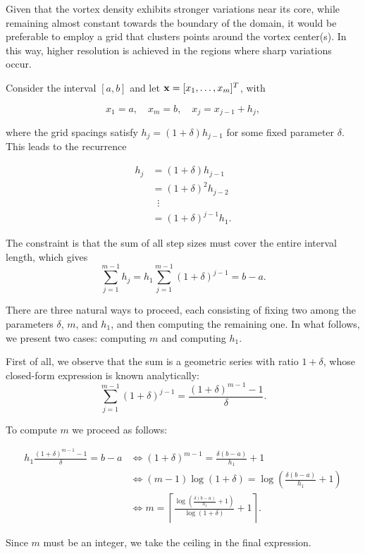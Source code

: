 Given that the vortex density exhibits stronger variations near its core, while remaining almost constant towards the boundary of the domain, it would be preferable to employ a grid that clusters points around the vortex center(s). 
In this way, higher resolution is achieved in the regions where sharp variations occur.

Consider the interval $[a,b]$ and let $\mathbf{x} = [x_1, \dots, x_m]^T$, with 

\[
    x_1 = a, \quad x_m = b, \quad x_j = x_{j-1} + h_j,
\]

where the grid spacings satisfy $h_j = (1 + \delta) h_{j-1}$ for some fixed parameter $\delta$.  
This leads to the recurrence

\begin{align*}
    h_j &= (1 + \delta) h_{j-1} \\
        &= (1 + \delta)^2 h_{j-2} \\
        &\;\;\vdots \\
        &= (1 + \delta)^{j-1} h_1.
\end{align*}

The constraint is that the sum of all step sizes must cover the entire interval length, which gives
\[
    \sum_{j=1}^{m-1} h_j
    = h_1 \sum_{j=1}^{m-1} (1+\delta)^{j-1} 
    = b-a.
\]

There are three natural ways to proceed, each consisting of fixing two among the parameters $\delta$, $m$, and $h_1$, and then computing the remaining one.  
In what follows, we present two cases: computing $m$ and computing $h_1$.

First of all, we observe that the sum is a geometric series with ratio $1+\delta$, whose closed-form expression is known analytically:  
\[
    \sum_{j=1}^{m-1} (1+\delta)^{j-1} = \frac{(1+\delta)^{m-1} - 1}{\delta}.
\]

To compute $m$ we proceed as follows:

\begin{align*}
    h_1 \frac{(1+\delta)^{m-1} - 1}{\delta} = b-a 
    &\iff (1+\delta)^{m-1} = \frac{\delta(b-a)}{h_1} + 1 \\
    &\iff (m-1)\log(1+\delta) = \log\!\left(\frac{\delta(b-a)}{h_1} + 1\right) \\
    &\iff m = \left\lceil \frac{\log\!\left(\tfrac{\delta(b-a)}{h_1} + 1\right)}{\log(1+\delta)} + 1 \right\rceil.
\end{align*}

Since $m$ must be an integer, we take the ceiling in the final expression.

